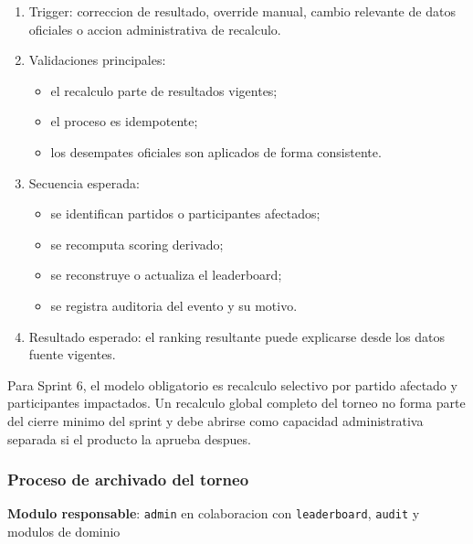 \begin{enumerate}
  \item Trigger: correccion de resultado, override manual, cambio relevante de datos oficiales o accion administrativa de recalculo.
  \item Validaciones principales:
    \begin{itemize}
      \item el recalculo parte de resultados vigentes;
      \item el proceso es idempotente;
      \item los desempates oficiales son aplicados de forma consistente.
    \end{itemize}
  \item Secuencia esperada:
    \begin{itemize}
      \item se identifican partidos o participantes afectados;
      \item se recomputa scoring derivado;
      \item se reconstruye o actualiza el leaderboard;
      \item se registra auditoria del evento y su motivo.
    \end{itemize}
  \item Resultado esperado: el ranking resultante puede explicarse desde los datos fuente vigentes.
\end{enumerate}

Para Sprint 6, el modelo obligatorio es recalculo selectivo por partido afectado y participantes impactados. Un recalculo global completo del torneo no forma parte del cierre minimo del sprint y debe abrirse como capacidad administrativa separada si el producto la aprueba despues.

\subsubsection{Proceso de archivado del torneo}

\textbf{Modulo responsable}: \texttt{admin} en colaboracion con \texttt{leaderboard}, \texttt{audit} y modulos de dominio

